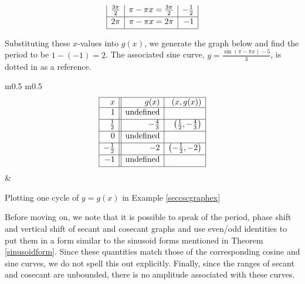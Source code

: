 {\begin{enumerate}
{\[\begin{array}{|r|r|r|}
\frac{3\pi}{2}  &  \pi - \pi x = \frac{3\pi}{2} & -\frac{1}{2} \\ [2pt] \hline 

2\pi  & \pi - \pi x = 2\pi & -1 \\  [2pt] \hline
\end{array} \]
\setlength{\extrarowheight}{0pt}}

Substituting these $x$-values into $g(x)$, we generate the graph below and find the period to be $1 - (-1) = 2$.   The associated sine curve, $y = \frac{\sin(\pi - \pi x) - 5}{3}$, is dotted in as a reference.  

\medskip

\noindent\hskip-30pt\begin{minipage}{\textwidth}
\begin{center}
\begin{tabular}{ m{} m{}}
\setlength{\extrarowheight}{2pt}
\[ \begin{array}{|r||r|r|}  

\hline

 x & g(x) & (x,g(x))  \\ \hline
1  & \text{undefined} &   \\ [2pt]   \hline
\frac{1}{2}  & -\frac{4}{3} &  \left(\frac{1}{2}, -\frac{4}{3} \right)  \\ [2pt] \hline 
0 & \text{undefined} &   \\ [2pt] \hline 
-\frac{1}{2} & -2 & \left(-\frac{1}{2}, -2\right)  \\ [2pt] \hline 
-1 & \text{undefined} &    \\ [2pt] \hline 
\end{array} \] \setlength{\extrarowheight}{0pt} & 

\end{tabular}
\end{center}
\captionsetup{type=figure}
\caption{Plotting one cycle of $y=g(x)$ in Example \ref{seccscgraphex}}
\end{minipage}

\end{enumerate}
}

\medskip

Before moving on, we note that it is possible to speak of the period, phase shift and vertical shift of secant and cosecant graphs and use even/odd identities to put them in a form similar to the sinusoid forms mentioned in Theorem \ref{sinusoidform}.  Since these quantities match those of the corresponding cosine and sine curves, we do not spell this out explicitly.  Finally, since the ranges of secant and cosecant are unbounded, there is no amplitude associated with these curves.

